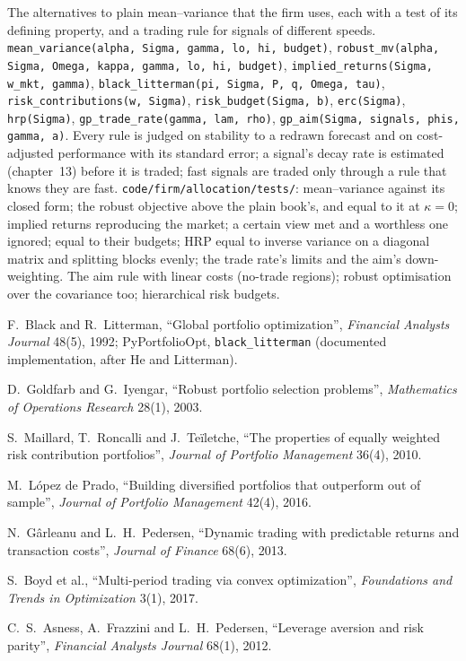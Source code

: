 \begin{build}
 The alternatives to plain mean--variance that the firm uses, each with a test of its defining property, and a trading rule for signals of
different speeds.
 \texttt{mean\_variance(alpha, Sigma, gamma, lo, hi, budget)}, \texttt{robust\_mv(alpha, Sigma, Omega, kappa, gamma, lo, hi, budget)},
\texttt{implied\_returns(Sigma, w\_mkt, gamma)}, \texttt{black\_litterman(pi, Sigma, P, q, Omega, tau)}, \texttt{risk\_contributions(w, Sigma)},
\texttt{risk\_budget(Sigma, b)}, \texttt{erc(Sigma)}, \texttt{hrp(Sigma)}, \texttt{gp\_trade\_rate(gamma, lam, rho)}, \texttt{gp\_aim(Sigma, signals, phis, gamma, a)}.
 Every rule is judged on stability to a redrawn forecast and on cost-adjusted performance with its standard error; a signal's decay rate is
estimated (chapter~13) before it is traded; fast signals are traded only through a rule that knows they are fast.
 \texttt{code/firm/allocation/tests/}: mean--variance against its closed form; the robust objective above the plain book's, and equal
to it at $\kappa = 0$; implied returns reproducing the market; a certain view met and a worthless one ignored;  equal to their budgets; HRP
equal to inverse variance on a diagonal matrix and splitting blocks evenly; the trade rate's limits and the aim's down-weighting.
 The aim rule with linear costs (no-trade regions); robust optimisation over the covariance too; hierarchical risk budgets.
\end{build}

\begin{omsources}
\item F.~Black and R.~Litterman, ``Global portfolio optimization'', \emph{Financial Analysts Journal} 48(5), 1992; PyPortfolioOpt, \texttt{black\_litterman}
(documented implementation, after He and Litterman).
\item D.~Goldfarb and G.~Iyengar, ``Robust portfolio selection problems'', \emph{Mathematics of Operations Research} 28(1), 2003.
\item S.~Maillard, T.~Roncalli and J.~Teïletche, ``The properties of equally weighted risk contribution portfolios'', \emph{Journal of Portfolio Management}
36(4), 2010.
\item M.~López de Prado, ``Building diversified portfolios that outperform out of sample'', \emph{Journal of Portfolio Management} 42(4), 2016.
\item N.~Gârleanu and L.~H.~Pedersen, ``Dynamic trading with predictable returns and transaction costs'', \emph{Journal of Finance} 68(6), 2013.
\item S.~Boyd et al., ``Multi-period trading via convex optimization'', \emph{Foundations and Trends in Optimization} 3(1), 2017.
\item C.~S.~Asness, A.~Frazzini and L.~H.~Pedersen, ``Leverage aversion and risk parity'', \emph{Financial Analysts Journal} 68(1), 2012.
\end{omsources}


